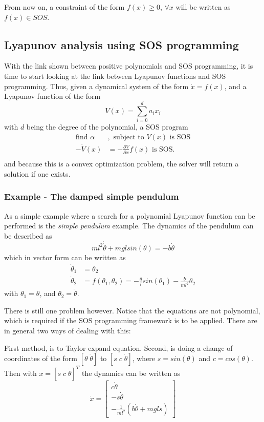 From now on, a constraint of the form \(f(x) \geq 0,\, \forall x\) will be
written as \(f(x) \in SOS\).

\subsection{Lyapunov analysis using SOS programming}

With the link shown between positive polynomials and \ac{SOS} programming, it is
time to start looking at the link between Lyapunov functions and SOS
programming. Thus, given a dynamical system of the form \(\dot{x} = f(x)\), and
a Lyapunov function of the form
\[
  V(x) = \sum_{i=0}^d a_ix_i
\]
with \(d\) being the degree of the polynomial, a \ac{SOS} program
\begin{align*}
  \text{find \(\alpha\)}&, \text{ subject to } V(x) \text{ is SOS}\\
  -\dot{V}(x) &= -\frac{\partial V}{\partial x}f(x) \text{ is SOS}.\\
\end{align*}
\cite{tedrakeUnderactuatedRoboticsAlgorithms2019} and because this is a convex
optimization problem, the solver will return a solution if one exists.

\subsubsection{Example - The damped simple pendulum}

As a simple example where a search for a polynomial Lyapunov function can be
performed is the \textit{simple pendulum} example. The dynamics of the pendulum
can be described as
\[
  ml^2\dot{\dot{\theta}} + mgl sin(\theta) = -b\dot{\theta}
\]
which in vector form can be written as
\begin{align*}
  \dot{\theta}_1 &= \theta_2 \\
  \dot{\theta}_2 &= f(\theta_1,\theta_2) = -\frac{g}{l}sin(\theta_1) -\frac{b}{ml^2}\theta_2
\end{align*}
with \(\theta_1 = \theta\), and \(\theta_2 = \dot{\theta}\).

There is still one problem however. Notice that the equations are not
polynomial, which is required if the \ac{SOS} programming framework is to be
applied. There are in general two ways of dealing with this:

First method, is to Taylor expand equation. Second, is doing a change of
coordinates of the form \(\left[ \theta \; \dot{\theta} \right] \) to \(\left[ s
  \;c \; \dot{\theta} \right]\), where \(s = sin(\theta)\) and \(c =
cos(\theta)\). Then with \(x = \left[ s \; c \; \dot{\theta} \right]^T\) the
dynamics can be written as
\[
  \dot{x} =
  \begin{bmatrix}
    c\dot{\theta} \\
    -s\dot{\theta} \\
    - \frac{1}{ml^2} \left( b\dot{\theta} + mgl s \right)
  \end{bmatrix}
\]

